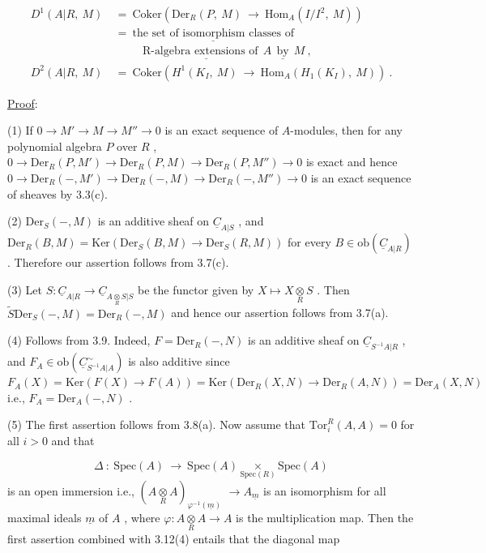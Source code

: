 \begin{equation*}
\begin{aligned}
D^1(A|R, \ M) \ &= \ \mathrm{Coker}(\mathrm{Der}_R(P, \ M) \ \to \ \mathrm{Hom}_A(I/I^2, \ M))\\
&= \ \underline{\text{the set of isomorphism classes of}}\\
&\qquad\ \ \text{R-}\underline{\text{algebra extensions of}} \ \ A \ \ \underline{\text{by}} \ \ M \ ,\\
D^2(A|R, \ M) \ &= \ \mathrm{Coker}(H^1(K_I, \ M) \ \to \ \mathrm{Hom}_A(H_1(K_I), \ M)) \ .
\end{aligned}
\end{equation*}

\underline{Proof}:

(1) If  $0 \to M' \to M \to M'' \to 0$  is an exact sequence of $A$-modules, then for any polynomial algebra  $P$  over  $R$  ,  $0 \to \mathrm{Der}_R(P, M') \to \mathrm{Der}_R(P, M) \to \mathrm{Der}_R(P, M'') \to 0$ is exact and hence  $0 \to \mathrm{Der}_R(-, M') \to \mathrm{Der}_R(-, M) \to \mathrm{Der}_R(-, M'') \to 0$  is an exact sequence of sheaves by 3.3(c).

(2) $\mathrm{Der}_S(-, M)$  is an additive sheaf on  $\underline{C}_{A|S}$  , and $\mathrm{Der}_R(B, M) = \mathrm{Ker}(\mathrm{Der}_S(B, M) \to \mathrm{Der}_S(R, M))$  for every  $B \in \mathrm{ob}(\underline{C}_{A|R})$  . Therefore our assertion follows from 3.7(c).

(3) Let  $S : \underline{C}_{A|R} \to \underline{C}_{A \underset{R}{\otimes} S|S}$  be the functor given by  $X \longmapsto X \underset{R}{\otimes} S$  . Then $\widetilde{S}\mathrm{Der}_S(-, M) = \mathrm{Der}_R(-, M)$  and hence our assertion follows from 3.7(a).


(4)  Follows from 3.9. Indeed,  $F = \mathrm{Der}_R(-, N)$  is an additive sheaf on $\underline{C}_{S^{-1}A|R}$  , and  $F_A \in \mathrm{ob}\left(\underline{C}^{\sim}_{S^{-1}A|A}\right)$  is also additive since $F_A(X) = \mathrm{Ker}(F(X) \to F(A)) = \mathrm{Ker}(\mathrm{Der}_R(X, N) \to \mathrm{Der}_R(A, N)) = \mathrm{Der}_A(X, N)$  i.e., $F_A = \mathrm{Der}_A(-, N)$  .

(5)  The first assertion follows from 3.8(a). Now assume that $\mathrm{Tor}^R_i(A, A) = 0$  for all  $i > 0$  and that

\begin{equation*}
\Delta \ : \ \mathrm{Spec}(A) \ \to \ \mathrm{Spec}(A) \underset{\mathrm{Spec}(R)}{\times} \mathrm{Spec}(A)
\end{equation*}
is an open immersion i.e.,  $(A \underset{R}{\otimes} A)_{\varphi^{-1}(\underline{m})}$  $\to A_{\underline{m}}$  is an isomorphism for all maximal ideals  $\underline{m}$  of  $A$  , where  $\varphi : A \underset{R}{\otimes} A \to A$  is the multiplication map. Then the first assertion combined with 3.12(4) entails that the diagonal map

